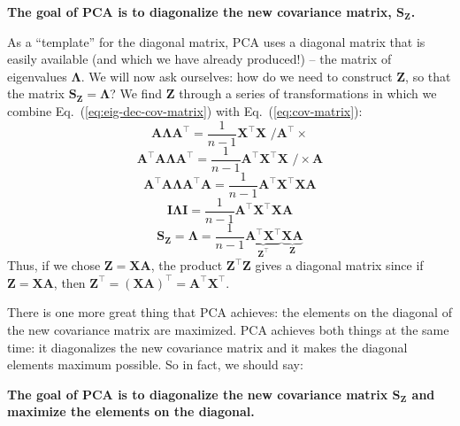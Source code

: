 \documentclass[10pt,twocolumn]{article}
\begin{document}
\noindent
\textbf{The goal of PCA is to diagonalize the new covariance matrix, $\mathbf{S_Z}$.}

As a ``template'' for the diagonal matrix, PCA uses a diagonal matrix that is easily available (and which we have already produced!) -- the matrix of eigenvalues $\mathbf{\Lambda}$. We will now ask ourselves: how do we need to construct $\mathbf{Z}$, so that the matrix $\mathbf{S_Z} = \mathbf{\Lambda}$?
We find $\mathbf{Z}$ through a series of transformations in which we combine Eq.~(\ref{eq:eig-dec-cov-matrix}) with Eq.~(\ref{eq:cov-matrix}):
\begin{equation}
\mathbf{A} \mathbf{\Lambda} \mathbf{A}^{\top} =  \frac{1}{n-1} \mathbf{X}^{\top} \mathbf{X} \,\, \Big/ \mathbf{A}^{\top} \times
\end{equation}
\begin{equation}
\mathbf{A}^{\top} \mathbf{A} \mathbf{\Lambda} \mathbf{A}^{\top} =  \frac{1}{n-1} \mathbf{A}^{\top}  \mathbf{X}^{\top} \mathbf{X} \,\, \Big/ \times \mathbf{A}
\end{equation}
\begin{equation}
\mathbf{A}^{\top} \mathbf{A} \mathbf{\Lambda} \mathbf{A}^{\top} \mathbf{A} =  \frac{1}{n-1} \mathbf{A}^{\top}  \mathbf{X}^{\top} \mathbf{X} \mathbf{A}
\end{equation}
\begin{equation}
\mathbf{I} \mathbf{\Lambda} \mathbf{I} =  \frac{1}{n-1} \mathbf{A}^{\top}  \mathbf{X}^{\top} \mathbf{X} \mathbf{A}
\end{equation}
\begin{equation}
\mathbf{S_Z}  = \mathbf{\Lambda} = \frac{1}{n-1} \underbrace{\mathbf{A}^{\top}  \mathbf{X}^{\top}}_{\mathbf{Z}^{\top}} \underbrace{\mathbf{X} \mathbf{A}}_{\mathbf{Z}}
\end{equation}
Thus, if we chose $\mathbf{Z} = \mathbf{X} \mathbf{A}$, the product $\mathbf{Z}^{\top} \mathbf{Z}$ gives a diagonal matrix since if $\mathbf{Z} = \mathbf{X} \mathbf{A}$, then $\mathbf{Z}^{\top} = (\mathbf{X} \mathbf{A})^{\top} = \mathbf{A}^{\top} \mathbf{X}^{\top}$.

There is one more great thing that PCA achieves: the elements on the diagonal of the new covariance matrix are maximized. PCA achieves both things at the same time: it diagonalizes the new covariance matrix and it makes the diagonal elements maximum possible. So in fact, we should say:

\noindent
\textbf{The goal of PCA is to diagonalize the new covariance matrix $\mathbf{S_Z}$ and maximize the elements on the diagonal.}
\end{document}
